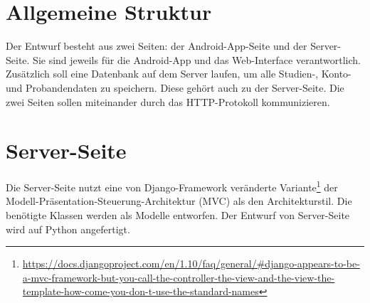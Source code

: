 \documentclass[a4paper]{scrreprt}
\begin{document}
    \tableofcontents

    \chapter{Allgemeine Struktur}
    
        Der Entwurf besteht aus zwei Seiten: der Android-App-Seite und der Server-Seite. Sie sind jeweils für die Android-App und das Web-Interface verantwortlich. Zusätzlich soll eine Datenbank auf dem Server laufen, um alle Studien-, Konto- und Probandendaten zu speichern. Diese gehört auch zu der Server-Seite. Die zwei Seiten sollen miteinander durch das HTTP-Protokoll kommunizieren.
        
    \chapter{Server-Seite}
        Die Server-Seite nutzt eine von Django-Framework veränderte Variante\footnote{\href{https://docs.djangoproject.com/en/1.10/faq/general/\#django-appears-to-be-a-mvc-framework-but-you-call-the-controller-the-view-and-the-view-the-template-how-come-you-don-t-use-the-standard-names}{https://docs.djangoproject.com/en/1.10/faq/general/\#django-appears-to-be-a-mvc-framework-but-you-call-the-controller-the-view-and-the-view-the-template-how-come-you-don-t-use-the-standard-names}} der Modell-Präsentation-Steuerung-Architektur (MVC) als den Architekturstil. Die benötigte Klassen werden als Modelle entworfen. Der Entwurf von Server-Seite wird auf Python angefertigt.
        
\end{document}
